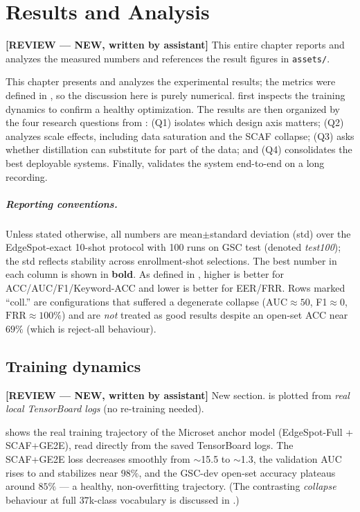 \documentclass[12pt,a4paper]{report}
\newcommand{\reviewnote}[1]{%
    \par\smallskip\noindent
    \colorbox{yellow!35}{\parbox{0.97\linewidth}{\small\textbf{[REVIEW — NEW, written by assistant]}\; #1}}%
    \par\smallskip}
\newcommand{\reviewnote}[1]{}
\newcommand{\code}[1]{\texttt{\small #1}}
\newcommand{\frr}{\text{FRR}}
\newcommand{\auc}{\text{AUC}}
\newcommand{\best}[1]{\textbf{#1}}
\begin{document}
\chapter{Results and Analysis}\label{ch:results}
\reviewnote{This entire chapter reports and analyzes the measured numbers and
references the result figures in \code{assets/}.}

This chapter presents and analyzes the experimental results; the metrics were
defined in , so the discussion here is purely numerical.
 first inspects the training dynamics to confirm a healthy
optimization. The results are then organized by the four research questions from
:  (Q1) isolates which design axis matters;
 (Q2) analyzes scale effects, including data saturation and the
SCAF collapse;  (Q3) asks whether distillation can substitute for
part of the data; and  (Q4) consolidates the best deployable
systems. Finally,  validates the system end-to-end on a
long recording.

\paragraph{Reporting conventions.} Unless stated otherwise, all numbers are
mean$\pm$standard deviation (std) over the EdgeSpot-exact 10-shot protocol with
100 runs on GSC test (denoted \emph{test100}); the std reflects stability across
enrollment-shot selections. The best number in each column is shown in
\best{bold}. As defined in , higher is better for
ACC/AUC/F1/Keyword-ACC and lower is better for EER/FRR. Rows marked ``coll.'' are
configurations that suffered a degenerate collapse ($\auc{\approx}50$,
F1$\approx$0, $\frr{\approx}100\%$) and are \emph{not} treated as good results
despite an open-set ACC near $69\%$ (which is reject-all behaviour).

\section{Training dynamics}\label{sec:res-train}
\reviewnote{New section.  is plotted from \emph{real local
TensorBoard logs} (no re-training needed).}

 shows the real training trajectory of the Microset anchor
model (EdgeSpot-Full + SCAF+GE2E), read directly from the saved TensorBoard logs.
The SCAF+GE2E loss decreases smoothly from $\sim$15.5 to $\sim$1.3, the validation
AUC rises to and stabilizes near $98\%$, and the GSC-dev open-set accuracy plateaus
around $85\%$ --- a healthy, non-overfitting trajectory. (The contrasting
\emph{collapse} behaviour at full $37$k-class vocabulary is discussed in
.)
\end{document}

